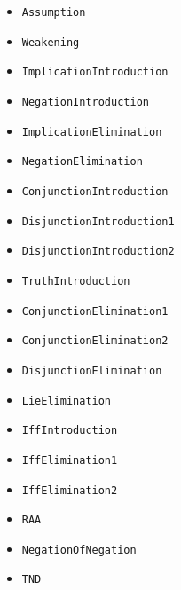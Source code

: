 \documentclass{article}
\begin{document}
\begin{itemize}
    \item \texttt{Assumption}
    \item \texttt{Weakening}
    \item \texttt{ImplicationIntroduction}
    \item \texttt{NegationIntroduction}
    \item \texttt{ImplicationElimination}
    \item \texttt{NegationElimination}
    \item \texttt{ConjunctionIntroduction}
    \item \texttt{DisjunctionIntroduction1}
    \item \texttt{DisjunctionIntroduction2}
    \item \texttt{TruthIntroduction}
    \item \texttt{ConjunctionElimination1}
    \item \texttt{ConjunctionElimination2}
    \item \texttt{DisjunctionElimination}
    \item \texttt{LieElimination}
    \item \texttt{IffIntroduction}
    \item \texttt{IffElimination1}
    \item \texttt{IffElimination2}
    \item \texttt{RAA}
    \item \texttt{NegationOfNegation}
    \item \texttt{TND}
\end{itemize}
\end{document}
